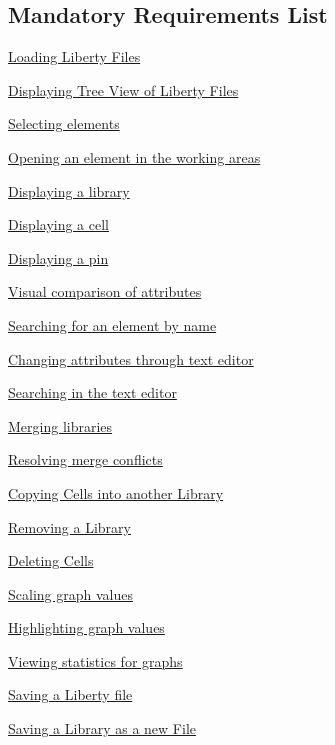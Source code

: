 \documentclass[10pt,a4paper]{report}
\newcommand{\refer}[2]{\hyperref[#1]{\textcolor{col:reference}{#2}}}
\begin{document}
\subsection{Mandatory Requirements List}
\begin{FR}
    \item \refer{FR-1}{Loading Liberty Files}
    \item \refer{FR-2}{Displaying Tree View of Liberty Files}
    \item \refer{FR-3}{Selecting elements}
    \item \refer{FR-4}{Opening an element in the working areas}
    \item \refer{FR-5}{Displaying a library}
    \item \refer{FR-6}{Displaying a cell}
    \item \refer{FR-7}{Displaying a pin}
    \item \refer{FR-8}{Visual comparison of attributes} %
    \item \refer{FR-9}{Searching for an element by name}
    \item \refer{FR-10}{Changing attributes through text editor}
    \item \refer{FR-11}{Searching in the text editor}
    \item \refer{FR-12}{Merging libraries}
    \item \refer{FR-13}{Resolving merge conflicts}
    \item \refer{FR-14}{Copying Cells into another Library}
    \item \refer{FR-15}{Removing a Library}
    \item \refer{FR-16}{Deleting Cells}
    \item \refer{FR-17}{Scaling graph values}
    \item \refer{FR-18}{Highlighting graph values}
    \item \refer{FR-19}{Viewing statistics for graphs}
    \item \refer{FR-20}{Saving a Liberty file}
    \item \refer{FR-21}{Saving a Library as a new File}
\end{FR}
\newpage 
\end{document}
